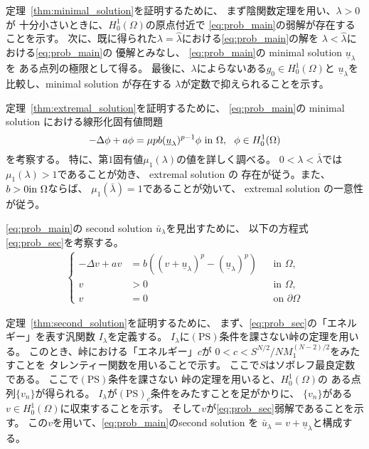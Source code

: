 定理~\ref{thm:minimal_solution}を証明するために、
まず陰関数定理を用い、$\lambda > 0$が
十分小さいときに、$H_0^1(\Omega)$の原点付近で
\ref{eq:prob_main}の弱解が存在することを示す。
次に、既に得られた$\lambda = \hat{\lambda}$における\ref{eq:prob_main}の解を
$\lambda < \hat{\lambda}$における\ref{eq:prob_main}の
優解とみなし、
\ref{eq:prob_main}の minimal solution $\underline{u}_\lambda$を
ある点列の極限として得る。
最後に、$\lambda$によらないある$g_0 \in H_0^1(\Omega)$と
$\underline{u}_\lambda$を比較し、minimal solution が存在する
$\lambda$が定数で抑えられることを示す。

定理~\ref{thm:extremal_solution}を証明するために、
\ref{eq:prob_main}の minimal solution における線形化固有値問題
\[
-\Delta \phi + a \phi = \mu p b (\underline{u}_\lambda)^{p-1} \phi
  ~\text{in}~ \Omega, \ \ \phi \in H_0^1(\Omega)
\] 
を考察する。
特に、第$1$固有値$\mu_1(\lambda)$の値を詳しく調べる。
$0 < \lambda < \bar{\lambda}$では
$\mu_1(\lambda) > 1$であることが効き、
extremal solution の
存在が従う。また、$b > 0 \text{in}~ \Omega$ならば、
$\mu_1(\bar{\lambda}) = 1$であることが効いて、
extremal solution の一意性が従う。

\ref{eq:prob_main}の second solution
$\bar{u}_\lambda$を見出すために、
以下の方程式\ref{eq:prob_sec}を考察する。
\begin{align}
 \left\{
 \begin{aligned}
   -\Delta v + a v &= b \left( (v + \underline{u}_\lambda)^p -
  (\underline{u}_\lambda)^p \right) 
  & &\text{in~} \Omega, \\
  v &> 0 & &\text{in~} \Omega, \\
  v &= 0 & &\text{on~} \partial\Omega
 \end{aligned}
 \right. \tag*{$(\heartsuit)_\lambda$} \label{eq:prob_sec}
\end{align}

定理~\ref{thm:second_solution}を証明するために、
まず、\ref{eq:prob_sec}の「エネルギー」を表す汎関数
$I_\lambda$を定義する。
$I_\lambda$に$(\mathrm{PS})$条件を課さない峠の定理を用いる。
このとき、峠における「エネルギー」$c$が
$0 < c < S^{N/2} / NM_1^{(N-2)/2}$をみたすことを
タレンティー関数を用いることで示す。
ここで$S$はソボレフ最良定数である。
ここで$(\mathrm{PS})$条件を課さない
峠の定理を用いると、$H_0^1(\Omega)$の
ある点列$\{ v_n \}$が得られる。
$I_\lambda$が$(\mathrm{PS})_c$条件をみたすことを足がかりに、
$\{ v_n \}$がある$v \in H_0^1(\Omega)$に収束することを示す。
そして$v$が\ref{eq:prob_sec}弱解であることを示す。
この$v$を用いて、\ref{eq:prob_main}のsecond solution を
$\bar{u}_\lambda = v + \underline{u}_\lambda$と構成する。

